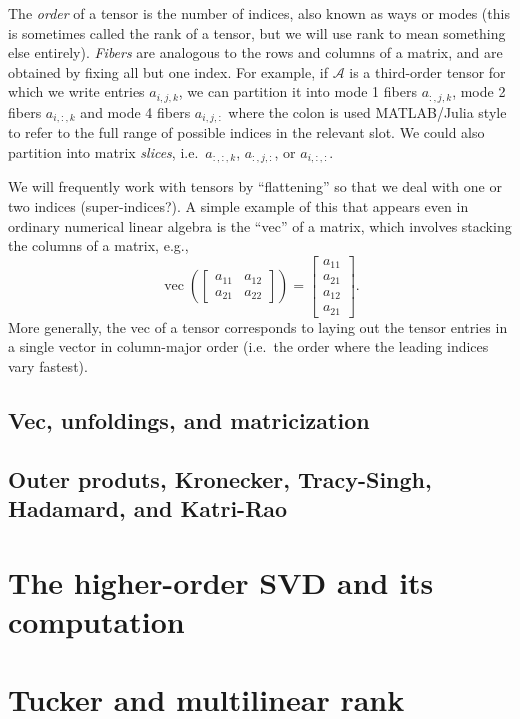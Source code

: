 \documentclass[12pt, leqno]{article} %
\begin{document}
The {\em order} of a tensor is the number of indices, also known as
ways or modes (this is sometimes called the rank of a tensor, but we
will use rank to mean something else entirely).  {\em Fibers} are
analogous to the rows and columns of a matrix, and are obtained by
fixing all but one index.  For example, if $\mathcal{A}$ is a
third-order tensor for which we write entries $a_{i,j,k}$, we can
partition it into mode 1 fibers $a_{:,j,k}$, mode 2 fibers $a_{i,:,k}$
and mode 4 fibers $a_{i,j,:}$ where the colon is used MATLAB/Julia
style to refer to the full range of possible indices in the relevant
slot.  We could also partition into matrix {\em slices},
i.e.~$a_{:,:,k}$, $a_{:,j,:}$, or $a_{i,:,:}$.

We will frequently work with tensors by ``flattening'' so that we deal
with one or two indices (super-indices?).  A simple example of this
that appears even in ordinary numerical linear algebra is the ``vec''
of a matrix, which involves stacking the columns of a matrix, e.g.,
\[
  \operatorname{vec}\left(
  \begin{bmatrix}
    a_{11} & a_{12} \\
    a_{21} & a_{22}
  \end{bmatrix} \right) =
  \begin{bmatrix} a_{11} \\ a_{21} \\ a_{12} \\ a_{21} \end{bmatrix}.
\]
More generally, the vec of a tensor corresponds to laying out the
tensor entries in a single vector in column-major order (i.e.~the
order where the leading indices vary fastest).

\subsection{Vec, unfoldings, and matricization}
\subsection{Outer produts, Kronecker, Tracy-Singh, Hadamard, and Katri-Rao}

\section{The higher-order SVD and its computation}

\section{Tucker and multilinear rank}
\end{document}
